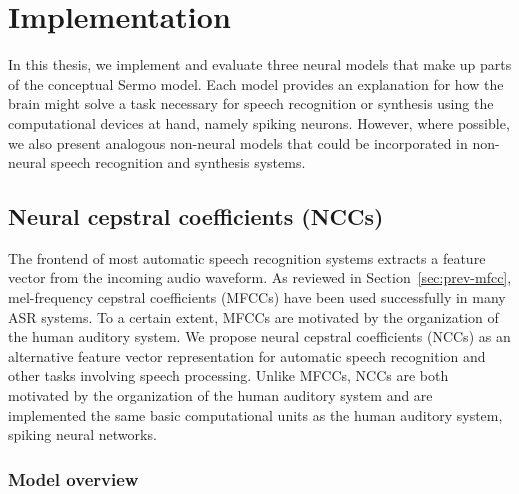 \chapter{Implementation}
\label{chapt:implementation}

In this thesis, we implement and evaluate
three neural models that make up
parts of the conceptual Sermo model.
Each model provides
an explanation for how the brain might
solve a task necessary for
speech recognition or synthesis
using the computational devices at hand,
namely spiking neurons.
However, where possible,
we also present analogous non-neural models
that could be incorporated in
non-neural speech recognition and synthesis systems.

\section{Neural cepstral coefficients (NCCs)}
\label{sec:ncc}


The frontend of most automatic speech recognition systems
extracts a feature vector from the incoming audio waveform.
As reviewed in Section~\ref{sec:prev-mfcc},
mel-frequency cepstral coefficients (MFCCs)
have been used successfully in many ASR systems.
To a certain extent, MFCCs are motivated
by the organization of the human auditory system.
We propose neural cepstral coefficients (NCCs)
as an alternative feature vector representation
for automatic speech recognition
and other tasks involving speech processing.
Unlike MFCCs, NCCs are both motivated
by the organization of the human auditory system
and are implemented the same basic computational units
as the human auditory system,
spiking neural networks.

\subsection{Model overview}


